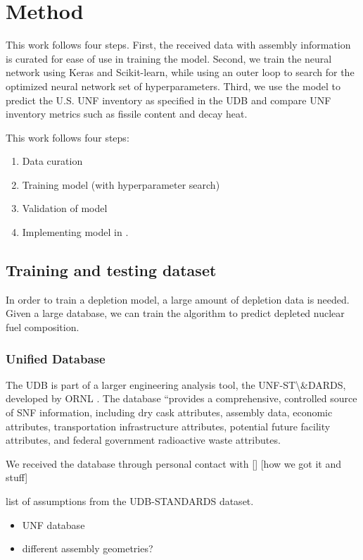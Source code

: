 \section{Method}

This work follows four steps. First, the
received data with assembly information is
curated for ease of use in training the model.
Second, we train the neural network using Keras and
Scikit-learn, while using an outer loop to
search for the optimized neural network set of hyperparameters.
Third, we use the model to predict the U.S. \gls{UNF}
inventory as specified in the \gls{UDB} and compare
\gls{UNF} inventory metrics such as fissile content
and decay heat.


This work follows four steps:
\begin{enumerate}
\item Data curation
\item Training model (with hyperparameter search)
\item Validation of model
\item Implementing model in \Cyclus.
\end{enumerate}

\subsection{Training and testing dataset}

In order to train a depletion model, a large amount of
depletion data is needed. Given a large database,
we can train the algorithm to predict depleted
nuclear fuel composition.

\subsubsection{Unified Database}
The \gls{UDB} is part of a larger engineering
analysis tool, the \gls{UNF-ST\&DARDS}, developed
by \gls{ORNL} \cite{peterson_used_2013}. The
database ``provides a comprehensive, controlled
source of \gls{SNF} information, including
dry cask attributes, assembly data, economic attributes,
transportation infrastructure attributes, potential future
facility attributes, and federal government radioactive
waste attributes.

We received the database through personal contact
with [] [how we got it and stuff]

list of assumptions from the \gls{UDB-STANDARDS} dataset.
\begin{itemize}
    \item UNF database 
    \item different assembly geometries?
\end{itemize}


